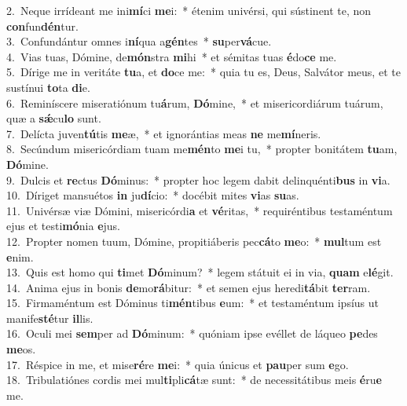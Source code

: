 {2.~}Neque irrídeant me ini\textbf{mí}ci \textbf{me}i:~* étenim univérsi, qui sústinent te, non \textbf{con}fun\textbf{dén}tur.\\
{3.~}Confundántur omnes i\textbf{ní}qua a\textbf{gén}tes~* \textbf{su}per\textbf{vá}cue.\\
{4.~}Vias tuas, Dómine, de\textbf{món}stra \textbf{mi}hi~* et sémitas tuas \textbf{é}do\textbf{ce} me.\\
{5.~}Dírige me in veritáte \textbf{tu}a, et \textbf{do}ce me:~* quia tu es, Deus, Salvátor meus, et te sustínui \textbf{to}ta \textbf{di}e.\\
{6.~}Reminíscere miseratiónum tu\textbf{á}rum, \textbf{Dó}mine,~* et misericordiárum tuárum, quæ a \textbf{sǽ}cu\textbf{lo} sunt.\\
{7.~}Delícta juven\textbf{tú}tis \textbf{me}æ,~* et ignorántias meas \textbf{ne} me\textbf{mí}neris.\\
{8.~}Secúndum misericórdiam tuam me\textbf{mén}to \textbf{me}i tu,~* propter bonitátem \textbf{tu}am, \textbf{Dó}mine.\\
{9.~}Dulcis et \textbf{re}ctus \textbf{Dó}minus:~* propter hoc legem dabit delinquénti\textbf{bus} in \textbf{vi}a.\\
{10.~}Díriget mansuétos \textbf{in} ju\textbf{dí}cio:~* docébit mites \textbf{vi}as \textbf{su}as.\\
{11.~}Univérsæ viæ Dómini, misericórdi\textbf{a} et \textbf{vé}ritas,~* requiréntibus testaméntum ejus et testi\textbf{mó}nia \textbf{e}jus.\\
{12.~}Propter nomen tuum, Dómine, propitiáberis pec\textbf{cá}to \textbf{me}o:~* \textbf{mul}tum est \textbf{e}nim.\\
{13.~}Quis est homo qui \textbf{ti}met \textbf{Dó}minum?~* legem státuit ei in via, \textbf{quam} e\textbf{lé}git.\\
{14.~}Anima ejus in bonis \textbf{de}mo\textbf{rá}bitur:~* et semen ejus heredi\textbf{tá}bit \textbf{ter}ram.\\
{15.~}Firmaméntum est Dóminus ti\textbf{mén}tibus \textbf{e}um:~* et testaméntum ipsíus ut manife\textbf{sté}tur \textbf{il}lis.\\
{16.~}Oculi mei \textbf{sem}per ad \textbf{Dó}minum:~* quóniam ipse evéllet de láqueo \textbf{pe}des \textbf{me}os.\\
{17.~}Réspice in me, et mise\textbf{ré}re \textbf{me}i:~* quia únicus et \textbf{pau}per sum \textbf{e}go.\\
{18.~}Tribulatiónes cordis mei mul\textbf{ti}pli\textbf{cá}tæ sunt:~* de necessitátibus meis \textbf{é}ru\textbf{e} me.\\
